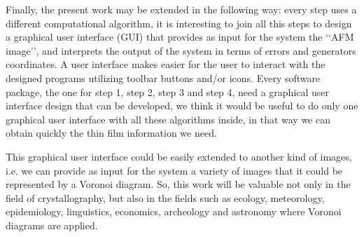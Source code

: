 \documentclass[a4paper,12pt]{article}
\newtheorem*{Condition 1}{Condition 1}
\newtheorem*{Condition 2}{Condition 2}
\theoremstyle{definition}
\theoremstyle{remark}
\begin{document}
Finally, the present work may be extended in the following way: every step uses a different computational algorithm, it is interesting to join all this steps to design a graphical user interface (GUI) that provides as input for the system the \lq\lq AFM image\rq\rq, and interprets the output of the system in terms of errors and generators coordinates. A user interface makes easier for the user to interact with the designed programs utilizing toolbar buttons and/or icons. Every software package, the one for step 1, step 2, step 3 and step 4, need a graphical user interface design that can be developed, we think it would be useful to do only one graphical user interface with all these algorithms inside, in that way we can obtain quickly the thin film information we need. 

This graphical user interface could be easily extended to another kind of images, i.e. we can provide as input for the system a variety of images that it could be represented by a Voronoi diagram. So, this work will be valuable not only in the field of crystallography, but also in the fields such as ecology, meteorology, epidemiology, linguistics, economics, archeology and astronomy where Voronoi diagrams are applied. 
\end{document}
